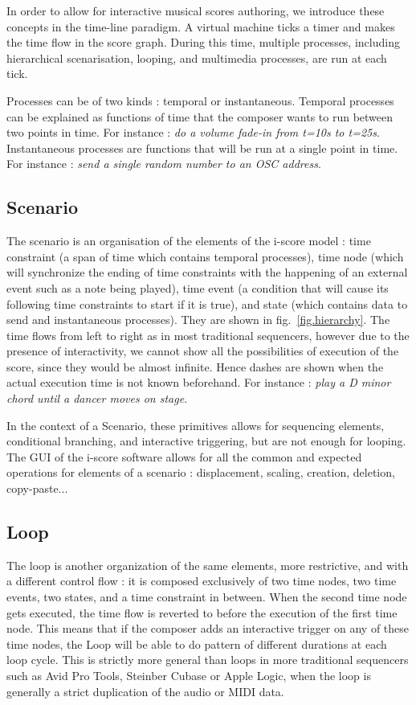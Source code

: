\documentclass{article}
\begin{document}
In order to allow for interactive musical scores authoring, we introduce these concepts in the time-line paradigm.
A virtual machine ticks a timer and makes the time flow in the score graph. 
During this time, multiple processes, including hierarchical scenarisation, looping, and multimedia processes, are 
run at each tick. 

Processes can be of two kinds : temporal or instantaneous.
Temporal processes can be explained as functions of time that the composer wants to run between 
two points in time. 
For instance : \emph{do a volume fade-in from t=10s to t=25s}.~\\
Instantaneous processes are functions that will be run at a single point in time.
For instance : \emph{send a single random number to an OSC address}.

\subsection{Scenario}
The scenario is an organisation of the elements of the i-score model : time constraint (a span of time which contains temporal processes), time node (which will synchronize the ending of time constraints with the happening of an external event such as a note being played), time event (a condition that will cause its following time constraints to start if it is true), and state (which contains data to send and instantaneous processes).
They are shown in fig.~\ref{fig.hierarchy}. 
The time flows from left to right as in most traditional sequencers, however due to the presence of interactivity, we cannot show all the possibilities of execution of the score, since they would be almost infinite. 
Hence dashes are shown when the actual execution time is not known beforehand. 
For instance : \emph{play a D minor chord until a dancer moves on stage}.

In the context of a Scenario, these primitives allows for sequencing elements, conditional branching, and interactive triggering, but are not enough for looping.
The GUI of the i-score software allows for all the common and expected operations for elements of a scenario : displacement, scaling, creation, deletion, copy-paste...

\subsection{Loop}
The loop is another organization of the same elements, more restrictive, and with a different control flow : it is 
composed exclusively of two time nodes, two time events, two states, and a time constraint in between.
When the second time node gets executed, the time flow is reverted to before the execution of the first time node.
This means that if the composer adds an interactive trigger on any of these time nodes, the Loop will be able to do pattern of different durations at each loop cycle.
This is strictly more general than loops in more traditional sequencers such as Avid Pro Tools, Steinber Cubase or Apple Logic, when the loop is generally a strict duplication of the audio or MIDI data.
\end{document}
